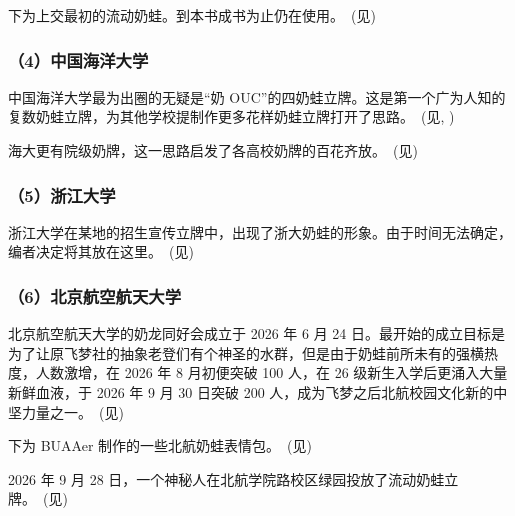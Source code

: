 下为上交最初的流动奶蛙。到本书成书为止仍在使用。~(见)

\clearpage


\subsubsection{（4）中国海洋大学}

中国海洋大学最为出圈的无疑是“奶 OUC”的四奶蛙立牌。这是第一个广为人知的复数奶蛙立牌，为其他学校提制作更多花样奶蛙立牌打开了思路。~(见, )





\clearpage
海大更有院级奶牌，这一思路启发了各高校奶牌的百花齐放。~(见)



\subsubsection{（5）浙江大学}

浙江大学在某地的招生宣传立牌中，出现了浙大奶蛙的形象。由于时间无法确定，编者决定将其放在这里。~(见)



\subsubsection{（6）北京航空航天大学}

北京航空航天大学的奶龙同好会成立于 2026 年 6 月 24 日。最开始的成立目标是为了让原飞梦社的抽象老登们有个神圣的水群，但是由于奶蛙前所未有的强横热度，人数激增，在 2026 年 8 月初便突破 100 人，在 26 级新生入学后更涌入大量新鲜血液，于 2026 年 9 月 30 日突破 200 人，成为飞梦之后北航校园文化新的中坚力量之一。~(见)



\clearpage
下为 BUAAer 制作的一些北航奶蛙表情包。~(见)



2026 年 9 月 28 日，一个神秘人在北航学院路校区绿园投放了流动奶蛙立牌。~(见)



